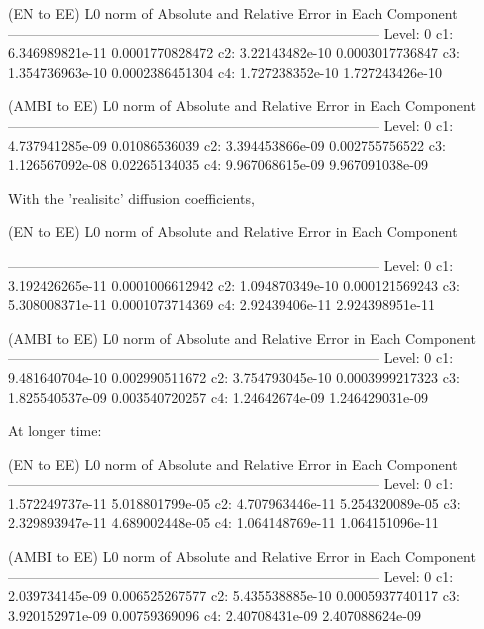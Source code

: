 \documentclass[final]{siamltex}
\begin{document}
(EN to EE) L0 norm of Absolute and Relative Error in Each Component
--------------------------------------------------------------------------------
Level:  0
                                c1:      6.346989821e-11     0.0001770828472
                                c2:       3.22143482e-10     0.0003017736847
                                c3:      1.354736963e-10     0.0002386451304
                                c4:      1.727238352e-10     1.727243426e-10


(AMBI to EE) L0 norm of Absolute and Relative Error in Each Component
--------------------------------------------------------------------------------
Level:  0
                                c1:      4.737941285e-09       0.01086536039
                                c2:      3.394453866e-09      0.002755756522
                                c3:      1.126567092e-08       0.02265134035
                                c4:      9.967068615e-09     9.967091038e-09

With the 'realisitc' diffusion coefficients,

(EN to EE) L0 norm of Absolute and Relative Error in Each Component

--------------------------------------------------------------------------------
Level:  0
                                c1:      3.192426265e-11     0.0001006612942
                                c2:      1.094870349e-10      0.000121569243
                                c3:      5.308008371e-11     0.0001073714369
                                c4:       2.92439406e-11     2.924398951e-11


(AMBI to EE) L0 norm of Absolute and Relative Error in Each Component
--------------------------------------------------------------------------------
Level:  0
                                c1:      9.481640704e-10      0.002990511672
                                c2:      3.754793045e-10     0.0003999217323
                                c3:      1.825540537e-09      0.003540720257
                                c4:       1.24642674e-09     1.246429031e-09

At longer time:

(EN to EE) L0 norm of Absolute and Relative Error in Each Component
--------------------------------------------------------------------------------
Level:  0
                                c1:      1.572249737e-11     5.018801799e-05
                                c2:      4.707963446e-11     5.254320089e-05
                                c3:      2.329893947e-11     4.689002448e-05
                                c4:      1.064148769e-11     1.064151096e-11


(AMBI to EE) L0 norm of Absolute and Relative Error in Each Component
--------------------------------------------------------------------------------
Level:  0
                                c1:      2.039734145e-09      0.006525267577
                                c2:      5.435538885e-10     0.0005937740117
                                c3:      3.920152971e-09       0.00759369096
                                c4:       2.40708431e-09     2.407088624e-09




\end{document}
